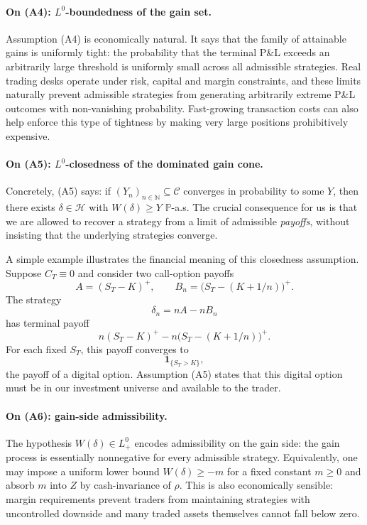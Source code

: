 \documentclass[11pt,a4paper]{report}
\numberwithin{equation}{chapter}
\theoremstyle{plain}
\theoremstyle{definition}
\newcommand{\PP}{\mathbb{P}}
\newcommand{\N}{\mathbb{N}}
\newcommand{\HH}{\mathcal{H}}
\newcommand{\CC}{\mathcal{C}}
\begin{document}
\paragraph{On (A4): $L^0$-boundedness of the gain set.}
Assumption (A4) is economically natural. It says that the family of attainable gains is uniformly tight: the probability that the terminal P\&L exceeds an arbitrarily large threshold is uniformly small across all admissible strategies. Real trading desks operate under risk, capital and margin constraints, and these limits naturally prevent admissible strategies from generating arbitrarily extreme P\&L outcomes with non-vanishing probability. Fast-growing transaction costs can also help enforce this type of tightness by making very large positions prohibitively expensive.

\paragraph{On (A5): $L^0$-closedness of the dominated gain cone.}
Concretely, (A5) says: if $(Y_n)_{n\in\N}\subseteq\CC$ converges in probability to some $Y$, then there exists $\delta\in\HH$ with $W(\delta)\ge Y$ $\PP$-a.s. The crucial consequence for us is that we are allowed to recover a strategy from a limit of admissible \emph{payoffs}, without insisting that the underlying strategies converge.

A simple example illustrates the financial meaning of this closedness assumption. Suppose $C_T\equiv0$ and consider two call-option payoffs
\[
    A=(S_T-K)^+,\qquad B_n=\bigl(S_T-(K+1/n)\bigr)^+.
\]
The strategy
\[
    \delta_n=nA-nB_n
\]
has terminal payoff
\[
    n(S_T-K)^+-n\bigl(S_T-(K+1/n)\bigr)^+.
\]
For each fixed $S_T$, this payoff converges to
\[
    \mathbf{1}_{\{S_T>K\}},
\]
the payoff of a digital option. Assumption (A5) states that this digital option must be in our investment universe and available to the trader.

\paragraph{On (A6): gain-side admissibility.}
The hypothesis $W(\delta)\in L^0_+$ encodes admissibility on the gain side: the gain process is essentially nonnegative for every admissible strategy. Equivalently, one may impose a uniform lower bound $W(\delta)\ge-m$ for a fixed constant $m\ge0$ and absorb $m$ into $Z$ by cash-invariance of $\rho$. This is also economically sensible: margin requirements prevent traders from maintaining strategies with uncontrolled downside and many traded assets themselves cannot fall below zero.
\end{document}
